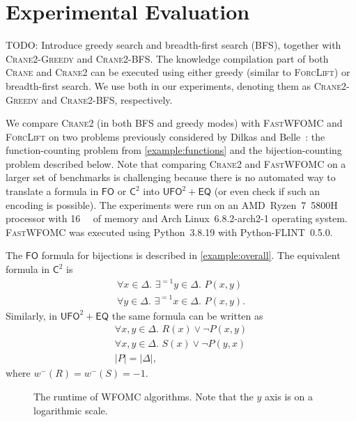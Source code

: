 \documentclass{article}
\theoremstyle{remark}
\newcommand{\Ctwo}{$\mathsf{C}^{2}$}
\newcommand{\FO}{$\mathsf{FO}$}
\newcommand{\UFO}{$\mathsf{UFO}^{2} + \mathsf{EQ}$}
\newcommand{\Cranetwo}{\textsc{Crane2}}
\newcommand{\Cranebfs}{\textsc{Crane2-BFS}}
\newcommand{\Cranegreedy}{\textsc{Crane2-Greedy}}
\begin{document}
\section{Experimental Evaluation}\label{sec:experiments}

TODO: Introduce greedy search and breadth-first search (BFS), together with
\Cranegreedy{} and \Cranebfs{}. The knowledge compilation part of both
\textsc{Crane} and \Cranetwo{} can be executed using either greedy (similar to
\textsc{ForcLift}) or breadth-first search. We use both in our experiments,
denoting them as \Cranegreedy{} and \Cranebfs{}, respectively.

We compare \Cranetwo{} (in both BFS and greedy modes) with \textsc{FastWFOMC}
and \textsc{ForcLift} on two problems previously considered by Dilkas and
Belle~: the function-counting problem from
\cref{example:functions} and the bijection-counting problem described below.
Note that comparing \Cranetwo{} and \textsc{FastWFOMC} on a larger set of
benchmarks is challenging because there is no automated way to translate a
formula in \FO{} or \Ctwo{} into \UFO{} (or even check if such an encoding is
possible). The experiments were run on an AMD~Ryzen~7~5800H processor with
\SI{16}{\gibi\byte} of memory and Arch Linux~6.8.2-arch2-1 operating system.
\textsc{FastWFOMC} was executed using Python~3.8.19 with Python-FLINT~0.5.0.

The \FO{} formula for bijections is described in \cref{example:overall}. The
equivalent formula in \Ctwo{} is
\begin{gather*}
  \forall x \in \Delta\text{. }\exists^{=1} y \in \Delta\text{. }P(x, y)\\
  \forall y \in \Delta\text{. }\exists^{=1} x \in \Delta\text{. }P(x, y).
\end{gather*}
Similarly, in \UFO{} the same formula can be written as
\begin{gather*}
  \forall x, y \in \Delta\text{. }R(x) \lor \neg P(x, y)\\
  \forall x, y \in \Delta\text{. }S(x) \lor \neg P(y, x)\\
  |P| = |\Delta|,
\end{gather*}
where $w^{-}(R) = w^{-}(S) = -1$.

\begin{figure}[t]
  \centering
  
  \caption{The runtime of WFOMC algorithms. Note that the $y$ axis is on a
    logarithmic scale.}\label{fig:plot}
\end{figure}
\end{document}
